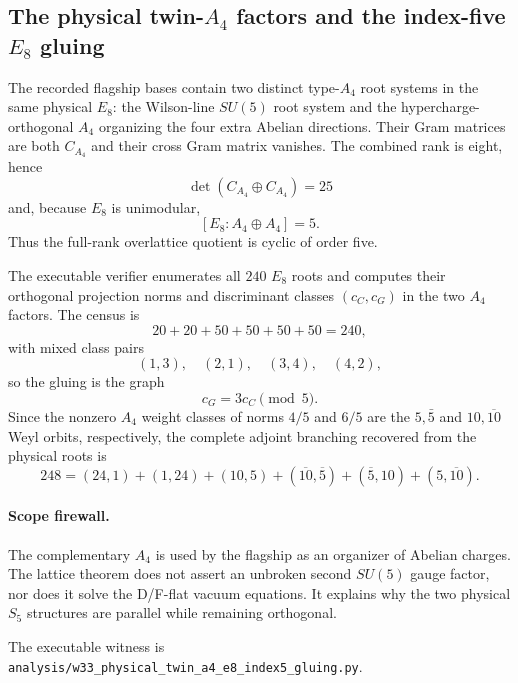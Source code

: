 \subsection*{The physical twin-$A_4$ factors and the index-five $E_8$ gluing}

The recorded flagship bases contain two distinct type-$A_4$ root systems in the
same physical $E_8$: the Wilson-line $SU(5)$ root system and the
hypercharge-orthogonal $A_4$ organizing the four extra Abelian directions.
Their Gram matrices are both $C_{A_4}$ and their cross Gram matrix vanishes.
The combined rank is eight, hence
\[
\det(C_{A_4}\oplus C_{A_4})=25
\]
and, because $E_8$ is unimodular,
\[
\boxed{[E_8:A_4\oplus A_4]=5.}
\]
Thus the full-rank overlattice quotient is cyclic of order five.

The executable verifier enumerates all $240$ $E_8$ roots and computes their
orthogonal projection norms and discriminant classes $(c_C,c_G)$ in the two
$A_4$ factors.  The census is
\[
20+20+50+50+50+50=240,
\]
with mixed class pairs
\[
(1,3),\quad(2,1),\quad(3,4),\quad(4,2),
\]
so the gluing is the graph
\[
\boxed{c_G=3c_C\pmod5.}
\]
Since the nonzero $A_4$ weight classes of norms $4/5$ and $6/5$ are the
$5,\bar5$ and $10,\overline{10}$ Weyl orbits, respectively, the complete
adjoint branching recovered from the physical roots is
\[
\boxed{
248=(24,1)+(1,24)+(10,5)+(\overline{10},\overline5)
 +(\overline5,10)+(5,\overline{10}) }.
\]

\paragraph{Scope firewall.}
The complementary $A_4$ is used by the flagship as an organizer of Abelian
charges.  The lattice theorem does not assert an unbroken second $SU(5)$ gauge
factor, nor does it solve the D/F-flat vacuum equations.  It explains why the
two physical $S_5$ structures are parallel while remaining orthogonal.

The executable witness is
\texttt{analysis/w33\_physical\_twin\_a4\_e8\_index5\_gluing.py}.
